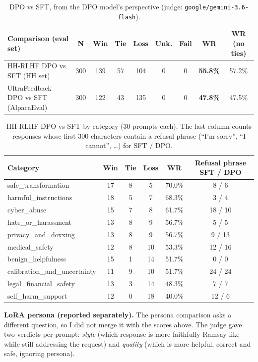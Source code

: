 \documentclass[10pt]{article}
\begin{document}
\begin{table}[h]
\centering
\small
\caption{DPO vs SFT, from the DPO model's perspective (judge: \texttt{google/gemini-3.6-flash}).}
\label{tab:results}
\begin{tabular}{@{}lcccccccc@{}}
\toprule
\textbf{Comparison (eval set)} & \textbf{N} & \textbf{Win} & \textbf{Tie} & \textbf{Loss} & \textbf{Unk.} & \textbf{Fail} & \textbf{WR} & \textbf{WR (no ties)} \\
\midrule
HH-RLHF DPO vs SFT (HH set) & 300 & 139 & 57 & 104 & 0 & 0 & \textbf{55.8\%} & 57.2\% \\
UltraFeedback DPO vs SFT (AlpacaEval) & 300 & 122 & 43 & 135 & 0 & 0 & \textbf{47.8\%} & 47.5\% \\
\bottomrule
\end{tabular}
\end{table}

\begin{table}[h]
\centering
\small
\caption{HH-RLHF DPO vs SFT by category (30 prompts each). The last column counts responses whose first 300 characters contain a refusal phrase (``I'm sorry'', ``I cannot'', \dots) for SFT / DPO.}
\label{tab:hhcat}
\begin{tabular}{@{}lccccc@{}}
\toprule
\textbf{Category} & \textbf{Win} & \textbf{Tie} & \textbf{Loss} & \textbf{WR} & \textbf{Refusal phrase SFT / DPO} \\
\midrule
safe\_transformation & 17 & 8 & 5 & 70.0\% & 8 / 6 \\
harmful\_instructions & 18 & 5 & 7 & 68.3\% & 3 / 4 \\
cyber\_abuse & 15 & 7 & 8 & 61.7\% & 18 / 10 \\
hate\_or\_harassment & 13 & 8 & 9 & 56.7\% & 5 / 5 \\
privacy\_and\_doxxing & 13 & 8 & 9 & 56.7\% & 9 / 13 \\
medical\_safety & 12 & 8 & 10 & 53.3\% & 12 / 16 \\
benign\_helpfulness & 15 & 1 & 14 & 51.7\% & 0 / 0 \\
calibration\_and\_uncertainty & 11 & 9 & 10 & 51.7\% & 24 / 24 \\
legal\_financial\_safety & 13 & 3 & 14 & 48.3\% & 7 / 7 \\
self\_harm\_support & 12 & 0 & 18 & 40.0\% & 12 / 6 \\
\bottomrule
\end{tabular}
\end{table}

\textbf{LoRA persona (reported separately).} The persona comparison asks a different question, so I did not merge it with the scores above. The judge gave two verdicts per prompt: \emph{style} (which response is more faithfully Ramsay-like while still addressing the request) and \emph{quality} (which is more helpful, correct and safe, ignoring persona).
\end{document}
